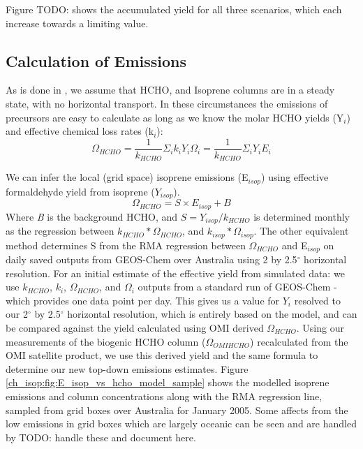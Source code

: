     Figure TODO: shows the accumulated yield for all three scenarios, which each increase towards a limiting value.
    
  \subsection{Calculation of Emissions}
    \label{ch_isop:sec:EmissionCalculation}
    As is done in \citet{Palmer2003, Millet2006, Bauwens2016}, we assume that HCHO, and Isoprene columns are in a steady state, with no horizontal transport.
    In these circumstances the emissions of precursors are easy to calculate as long as we know the molar HCHO yields (Y$_i$) and effective chemical loss rates (k$_i$):
    \begin{equation}
      \Omega_{HCHO} = \frac{1}{k_{HCHO}}\Sigma_i k_i Y_i \Omega_i = \frac{1}{k_{HCHO}}\Sigma_i Y_i E_i
    \end{equation}
    
    We can infer the local (grid space) isoprene emissions (E$_{isop}$) using effective formaldehyde yield from isoprene ($Y_{isop}$).
    \begin{equation} \label{ch_isop:eqn:isop_yield}
      \Omega_{HCHO} = S \times E_{isop} + B
    \end{equation}
    Where \textit{B} is the background HCHO, and $S = Y_{isop}/k_{HCHO}$ is determined monthly as the regression between $k_{HCHO}*\Omega_{HCHO}$, and $k_{isop}*\Omega_{isop}$.
    The other equivalent method determines S from the RMA regression between $\Omega_{HCHO}$ and E$_{isop}$ on daily saved outputs from GEOS-Chem over Australia using 2 by 2.5$^{\circ}$ horizontal resolution.
    For an initial estimate of the effective yield from simulated data: we use $k_{HCHO}$, $k_{i}$, $\Omega_{HCHO}$, and $\Omega_i$ outputs from a standard run of GEOS-Chem - which provides one data point per day.
    This gives us a value for $Y_i$ resolved to our 2$^{\circ}$ by 2.5$^{\circ}$ horizontal resolution, which is entirely based on the model, and can be compared against the yield calculated using OMI derived $\Omega_{HCHO}$.
    Using our measurements of the biogenic HCHO column ($\Omega_{OMIHCHO}$) recalculated from the OMI satellite product, we use this derived yield and the same formula to determine our new top-down emissions estimates.
    Figure \ref{ch_isop:fig:E_isop_vs_hcho_model_sample} shows the modelled isoprene emissions and column concentrations along with the RMA regression line, sampled from grid boxes over Australia for January 2005. 
    Some affects from the low emissions in grid boxes which are largely oceanic can be seen and are handled by TODO: handle these and document here.
    
